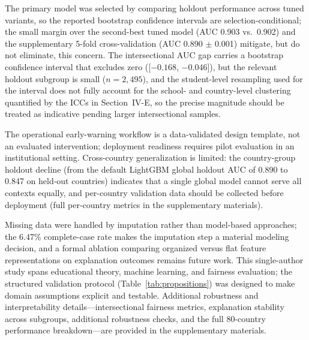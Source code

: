 \documentclass[journal]{IEEEtran}
\begin{document}
The primary model was selected by comparing holdout performance across tuned variants, so the reported bootstrap confidence intervals are selection-conditional; the small margin over the second-best tuned model (AUC 0.903 vs.\ 0.902) and the supplementary 5-fold cross-validation (AUC 0.890 $\pm$ 0.001) mitigate, but do not eliminate, this concern. The intersectional AUC gap carries a bootstrap confidence interval that excludes zero ([$-0.168$, $-0.046$]), but the relevant holdout subgroup is small ($n = 2{,}495$), and the student-level resampling used for the interval does not fully account for the school- and country-level clustering quantified by the ICCs in Section~IV-E, so the precise magnitude should be treated as indicative pending larger intersectional samples.

The operational early-warning workflow is a data-validated design template, not an evaluated intervention; deployment readiness requires pilot evaluation in an institutional setting. Cross-country generalization is limited: the country-group holdout decline (from the default LightGBM global holdout AUC of 0.890 to 0.847 on held-out countries) indicates that a single global model cannot serve all contexts equally, and per-country validation data should be collected before deployment (full per-country metrics in the supplementary materials).

Missing data were handled by imputation rather than model-based approaches; the 6.47\% complete-case rate makes the imputation step a material modeling decision, and a formal ablation comparing organized versus flat feature representations on explanation outcomes remains future work. This single-author study spans educational theory, machine learning, and fairness evaluation; the structured validation protocol (Table~\ref{tab:propositions}) was designed to make domain assumptions explicit and testable. Additional robustness and interpretability details---intersectional fairness metrics, explanation stability across subgroups, additional robustness checks, and the full 80-country performance breakdown---are provided in the supplementary materials.
\end{document}
